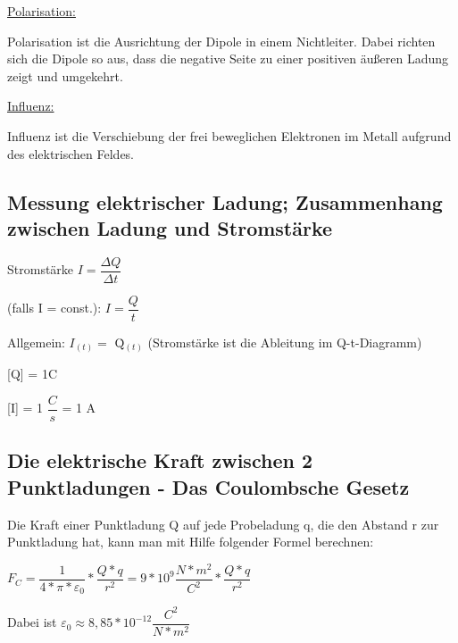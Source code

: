\documentclass[12pt]{scrartcl}
\begin{document}
\begin{flushleft}
			\vspace{2mm}
			\underline{Polarisation:}
			
			\vspace{2mm}
			Polarisation ist die Ausrichtung der Dipole in einem Nichtleiter. Dabei richten sich die Dipole so aus, dass die negative Seite zu einer positiven äußeren Ladung zeigt und umgekehrt.
			
			\vspace{2mm}
			\underline{Influenz:}
			
			\vspace{2mm}
			Influenz ist die Verschiebung der frei beweglichen Elektronen im Metall aufgrund des elektrischen Feldes.
			
			\newpage
		\subsection{Messung elektrischer Ladung; Zusammenhang zwischen Ladung und Stromstärke}
		
		\vspace{2mm}
		Stromstärke $ I = \dfrac{\Delta Q}{\Delta t} $
		
		\vspace{2mm}
		(falls I = const.): $ I = \dfrac{Q}{t} $
		
		\vspace{2mm}
		Allgemein: $ I_{(t)} = $ \.{Q}$_{(t)} $ (Stromstärke ist die Ableitung im Q-t-Diagramm)
		
		\vspace{2mm}
		[Q] = 1C
		
		\vspace{3mm}
		[I] = 1 $ \dfrac{C}{s} $ = 1 A
		
		\vspace{10mm}
		\subsection{Die elektrische Kraft zwischen 2 Punktladungen - Das Coulombsche Gesetz}
		Die Kraft einer Punktladung Q auf jede Probeladung q, die den Abstand r zur Punktladung hat, kann man mit Hilfe folgender Formel berechnen:
		
		\vspace{3mm}
		$ F_{C} = \dfrac{1}{4 \ast \pi \ast \varepsilon _{0} } \ast \dfrac{Q \ast q}{r^{2}} = 9 \ast 10^{9} \dfrac{N \ast m^{2}}{C^{2}} \ast \dfrac{Q \ast q}{r^{2}} $
		
		\vspace{3mm}
		Dabei ist $ \varepsilon_{0} \approx 8,85 \ast 10^{-12} \dfrac{C^{2}}{N \ast m^{2}} $
		

\end{flushleft}
\end{document}
